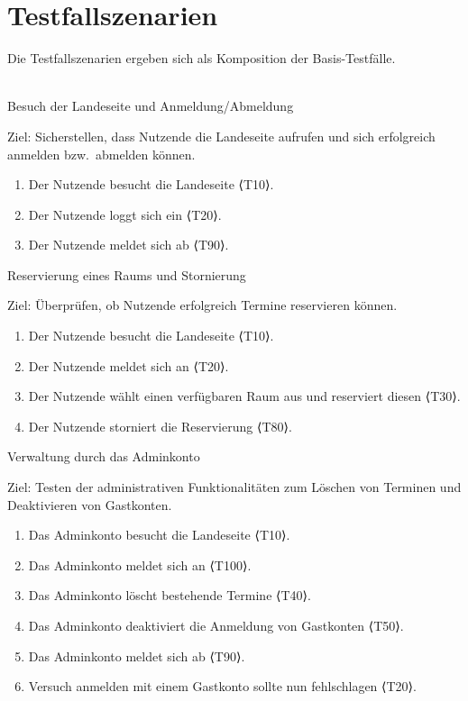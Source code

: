 \section{Testfallszenarien}
Die Testfallszenarien ergeben sich als Komposition der Basis-Testfälle.\\ \\
\begin{scenario}{10}{Besuch der Landeseite und Anmeldung/Abmeldung}
  \item[Ziel:] Sicherstellen, dass Nutzende die Landeseite aufrufen und sich erfolgreich anmelden bzw.\ abmelden können.
  \begin{enumerate}
    \item Der Nutzende besucht die Landeseite ⟨T10⟩.
    \item Der Nutzende loggt sich ein ⟨T20⟩.
    \item Der Nutzende meldet sich ab ⟨T90⟩.
  \end{enumerate}
\end{scenario}

\pagebreak

\begin{scenario}{20}{Reservierung eines Raums und Stornierung}
  \item[Ziel:] Überprüfen, ob Nutzende erfolgreich Termine reservieren können.
  \begin{enumerate}
    \item Der Nutzende besucht die Landeseite ⟨T10⟩.
    \item Der Nutzende meldet sich an ⟨T20⟩.
    \item Der Nutzende wählt einen verfügbaren Raum aus und reserviert diesen ⟨T30⟩.
    \item Der Nutzende storniert die Reservierung ⟨T80⟩.
  \end{enumerate}
\end{scenario}

\begin{scenario}{30}{Verwaltung durch das Adminkonto}
  \item[Ziel:] Testen der administrativen Funktionalitäten zum Löschen von Terminen und Deaktivieren von Gastkonten.
  \begin{enumerate}
    \item Das Adminkonto besucht die Landeseite ⟨T10⟩.
    \item Das Adminkonto meldet sich an ⟨T100⟩.
    \item Das Adminkonto löscht bestehende Termine ⟨T40⟩.
    \item Das Adminkonto deaktiviert die Anmeldung von Gastkonten ⟨T50⟩.
    \item Das Adminkonto meldet sich ab ⟨T90⟩.
    \item Versuch anmelden mit einem Gastkonto sollte nun fehlschlagen ⟨T20⟩.
  \end{enumerate}
\end{scenario}

